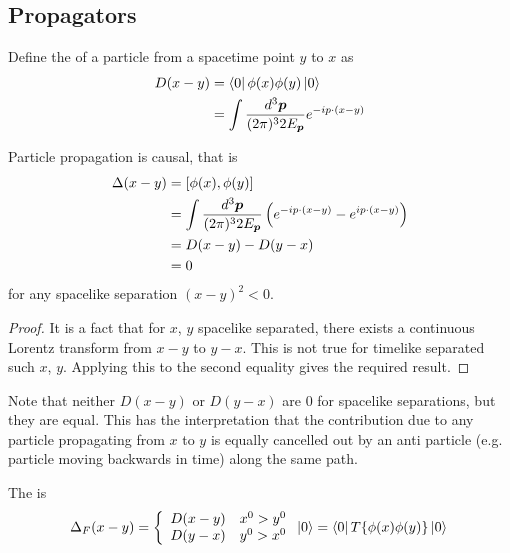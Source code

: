\documentclass{article}
\begin{document}
\subsection{Propagators}

\begin{definition}[Propagator]
Define the  of a particle from a spacetime point $y$ to $x$ as 
\begin{align*}
D(x-y) &= \bra{0} \phi(x) \phi(y) \ket{0} \\
  &= \int \LImeas e^{-ip\cdot(x-y)}
\end{align*}
\end{definition}

\begin{theorem}
Particle propagation is causal, that is 
\begin{align*}
    \Delta(x-y) &= \comm[\phi(x)]{\phi(y)} \\
     &= \int \LImeas \left( e^{-ip\cdot(x-y)} - e^{ip\cdot(x-y)} \right) \\
     &= D(x-y) - D(y-x) \\
     &= 0 
\end{align*}
for any spacelike separation $(x-y)^2 <0$. 
\end{theorem}
\begin{proof}
It is a fact that for $x$, $y$ spacelike separated, there exists a continuous Lorentz transform from $x-y$ to $y-x$. This is not true for timelike separated such $x$, $y$. Applying this to the second equality gives the required result. 
\end{proof}

\begin{idea}
Note that neither $D(x-y)$ or $D(y-x)$ are $0$ for spacelike separations, but they are equal. This has the interpretation that the contribution due to any particle propagating from $x$ to $y$ is equally cancelled out by an anti particle (e.g. particle moving backwards in time) along the same path.
\end{idea}

\begin{definition}
The  is 
\[
\Delta_F(x-y) = \left\{ \begin{array}{lc} D(x-y) & x^0 > y^0 \\
    D(y-x) & y^0 > x^0 
    \end{array} \right. \ket{0} = \bra{0} T\{\phi(x) \phi(y) \} \ket{0} \\
\]
\end{definition}
\end{document}

